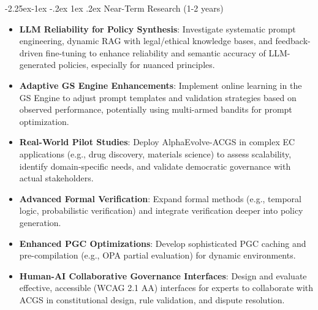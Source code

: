 \documentclass[manuscript,screen,review,anonymous,9pt]{acmart}
\makeatletter
\renewcommand\subsection{\@startsection{subsection}{2}{\z@}%
  {-2.25ex\@plus -1ex \@minus -.2ex}%
  {1ex \@plus .2ex}%
  {\normalfont\large\bfseries}}
\makeatother
\begin{document}
\subsection{Near-Term Research (1-2 years)}
\label{subsec:near_term_research}
\begin{itemize}[leftmargin=*,itemsep=1pt,parsep=1pt]
    \item \textbf{LLM Reliability for Policy Synthesis}: Investigate systematic prompt engineering, dynamic RAG with legal/ethical knowledge bases, and feedback-driven fine-tuning to enhance reliability and semantic accuracy of LLM-generated policies, especially for nuanced principles.
    \item \textbf{Adaptive GS Engine Enhancements}: Implement online learning in the GS Engine to adjust prompt templates and validation strategies based on observed performance, potentially using multi-armed bandits for prompt optimization.
    \item \textbf{Real-World Pilot Studies}: Deploy AlphaEvolve-ACGS in complex EC applications (e.g., drug discovery, materials science) to assess scalability, identify domain-specific needs, and validate democratic governance with actual stakeholders.
    \item \textbf{Advanced Formal Verification}: Expand formal methods (e.g., temporal logic, probabilistic verification) and integrate verification deeper into policy generation.
    \item \textbf{Enhanced PGC Optimizations}: Develop sophisticated PGC caching and pre-compilation (e.g., OPA partial evaluation) for dynamic environments.
    \item \textbf{Human-AI Collaborative Governance Interfaces}: Design and evaluate effective, accessible (WCAG 2.1 AA) interfaces for experts to collaborate with ACGS in constitutional design, rule validation, and dispute resolution.
\end{itemize}
\end{document}
